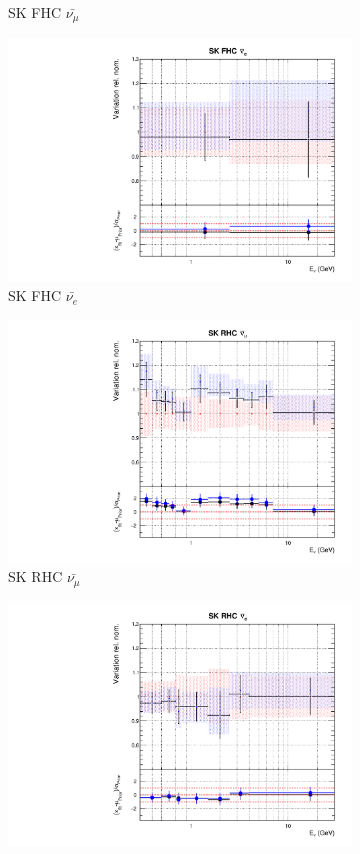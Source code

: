 \begin{figure}
\begin{subfigure}{0.24\textwidth}
  \caption{SK FHC $\bar{\nu_{\mu}}$}
\end{subfigure}
\begin{subfigure}{0.24\textwidth}
  \centering
  \includegraphics[width=0.95\linewidth]{figs/comp5q2vs8q2flux11}
  \caption{SK FHC $\bar{\nu_{e}}$}
\end{subfigure}
\begin{subfigure}{0.24\textwidth}
  \centering
  \includegraphics[width=0.95\linewidth]{figs/comp5q2vs8q2flux12}
  \caption{SK RHC $\bar{\nu_{\mu}}$}
\end{subfigure}
\begin{subfigure}{0.24\textwidth}
  \centering
  \includegraphics[width=0.95\linewidth]{figs/comp5q2vs8q2flux13}

\end{subfigure}
\end{figure}
